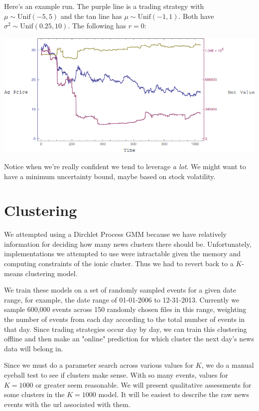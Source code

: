 \documentclass{article}
\begin{document}
Here's an example run. The purple line is a trading strategy with $\mu\sim\text{Unif}(-5,5)$ and the tan line has $\mu\sim\text{Unif}(-1,1)$. Both have $\sigma^2\sim\text{Unif}(0.25,10)$. The following has $r=0$:

\begin{center}
\includegraphics[scale=0.5]{../KellyRun-Random.png}
\end{center}

Notice when we're really confident we tend to leverage {\em a lot}. We might want to have a minimum uncertainty bound, maybe based on stock volatility.

		\section{Clustering}
	
	We attempted using a Dirchlet Process GMM because we have relatively information for deciding how many news clusters there should be. Unfortunately, implementations we attempted to use were intractable given the memory and computing constraints of the ionic cluster. Thus we had to revert back to a $K$-means clustering model.

	We train these models on a set of randomly sampled events for a given date range, for example, the date range of 01-01-2006 to 12-31-2013. Currently we sample 600,000 events across 150 randomly chosen files in this range, weighting the number of events from each day according to the total number of events in that day. Since trading strategies occur day by day, we can train this clustering offline and then make an "online" prediction for which cluster the next day's news data will belong in.

	Since we must do a parameter search across various values for $K$, we do a manual eyeball test to see if clusters make sense. With so many events, values for $K=1000$ or greater seem reasonable. We will present qualitative assessments for some clusters in the $K=1000$ model. It will be easiest to describe the raw news events with the url associated with them.
\end{document}
